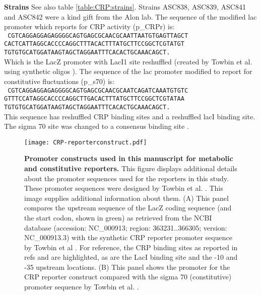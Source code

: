 \textbf{Strains} See also table \ref{table:CRP:strains}. 
%
Strains ASC838, ASC839, ASC841 and ASC842 were a kind gift from the Alon lab. 
%
The sequence of the modified lac promoter which reports for CRP activity (p\_CRPr) is:\\
%
\texttt{
CGTCAGGAGGAGAGGGGCAGTGAGCGCAACGCAATTAATGTGAGTTAGCT\\
CACTCATTAGGCACCCCAGGCTTTACACTTTATGCTTCCGGCTCGTATGT\\
TGTGTGCATGGATAAGTAGCTAGGAATTTCACACTGCAAACAGCT.}\\
Which is the LacZ promoter with LacI1 site reshuffled (created by Towbin et al. using synthetic oligos \cite{Towbin2017}).
%
The sequence of the lac promoter modified to report for constitutive fluctuations (p\_s70) is:\\
\texttt{
CGTCAGGAGGAGAGGGGCAGTGAGCGCAACGCAATCAGATCAAATGTGTC\\
GTTTCCATAGGCACCCCAGGCTTGACACTTTATGCTTCCGGCTCGTATAA\\
TGTGTGCATGGATAAGTAGCTAGGAATTTCACACTGCAAACAGCT.}\\
This sequence has reshuffled CRP binding sites and a reshuffled lacI binding site. 
The sigma 70 site was changed to a consensus binding site \cite{Towbin2017}.
%
\begin{figure}
    \centering
    \texttt{[image: CRP-reporterconstruct.pdf]}
    \caption{ 
        \textbf{Promoter constructs used in this manuscript for metabolic and constitutive reporters.}
        This figure displays additional details about the promoter sequences used for the reporters in this study.
        These promoter sequences were designed by Towbin et al. \cite{Towbin2017}.
        This image supplies additional information about them.
        (A) This panel compares the upstream sequence of the LacZ coding sequence (and the start codon, shown in green) as retrieved from the NCBI database (accession: NC\_000913; region: 363231..366305; version: NC\_000913.3) with
        the synthetic CRP reporter promoter sequence by Towbin et al \cite{Towbin2017}.
        For reference, the CRP 
        binding sites as reported in refs \cite{Hudson1990} and \cite{Lawson2004} are highlighted, as are the LacI binding site and the -10 and -35 upstream locations.
        (B) This panel shows the promoter for the CRP reporter construct compared with the sigma 70 (constitutive) promoter sequence by Towbin et al. \cite{Towbin2017}.
    }        %
    \label{fig:CRP:promoterconstructs}
\end{figure}
